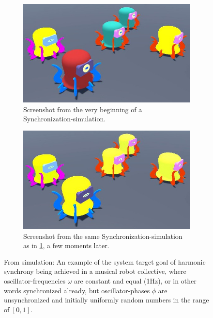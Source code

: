\begin{figure}[ht!]
\centering
	\begin{subfigure}[t]{.5\textwidth}
		\centering\captionsetup{width=.9\linewidth}%
		\includegraphics[width=0.9\linewidth]{Assets/DocSegments/Chapters/Implementation/Figures/Simulations/squiggles_unsynched_in_simulation.jpg}
		\caption{Screenshot from the very beginning of a Synchronization-simulation.}
		\label{fig:first_idea:second_fig:unsynched}
	\end{subfigure}%
	\begin{subfigure}[t]{.5\textwidth}
		\centering\captionsetup{width=.9\linewidth}%
		\includegraphics[width=0.9\linewidth]{Assets/DocSegments/Chapters/Implementation/Figures/Simulations/squiggles_synched_in_simulation.jpg}
		\caption{Screenshot from the same Synchronization-simulation as in \ref{fig:first_idea:second_fig:unsynched}, a few moments later.}
		\label{fig:first_idea:second_fig:synched}
	\end{subfigure}
\caption[Synchronization-example/-screenshots from simulation in Unity]{From simulation: An example of the system target goal of harmonic synchrony being achieved in a musical robot collective, where oscillator-frequencies $\omega$ are constant and equal (1Hz), or in other words synchronized already, but oscillator-phases $\phi$ are unsynchronized and initially uniformly random numbers in the range of $[0,1]$. \nl
}
\end{figure}
